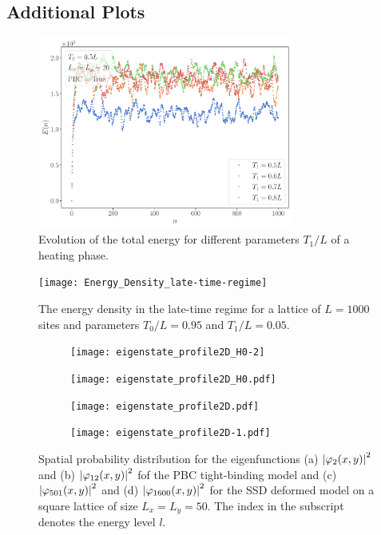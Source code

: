\documentclass[11pt, a4paper, oneside]{book}
\theoremstyle{definition} %
\begin{document}
\begin{appendices}
\chapter{Additional Plots}
\begin{figure}
\centering
\includegraphics[width = 0.75\textwidth]{TotalEnergyHeating2d_Multiple}
\caption{Evolution of the total energy for different parameters $T_1/L$ of a heating phase.}
\label{Total_Energy_heating2d-multiple}
\end{figure}


\begin{figure}
\centering
\texttt{[image: Energy\_Density\_late-time-regime]}
\caption{The energy density in the late-time regime for a lattice of $L=1000$ sites and parameters $T_0/L = 0.95$ and $T_1/L = 0.05$.}
\label{fig:Energy_density-late-regime}
\end{figure}



\begin{figure}
\begin{subfigure}{.5\textwidth}
  \centering
  \texttt{[image: eigenstate\_profile2D\_H0-2]}
  \caption{}
\end{subfigure}
\begin{subfigure}{.5\textwidth}
  \centering
  \texttt{[image: eigenstate\_profile2D\_H0.pdf]}  
  \caption{}
\end{subfigure}

\begin{subfigure}{.5\textwidth}
  \centering
  \texttt{[image: eigenstate\_profile2D.pdf]}
  \caption{}
\end{subfigure}
\begin{subfigure}{.5\textwidth}
  \centering
  \texttt{[image: eigenstate\_profile2D-1.pdf]}  
  \caption{}
\end{subfigure}
\caption{Spatial probability distribution for the eigenfunctions (a) $\abs{\varphi_2(x,y)}^2$ and (b) $\abs{\varphi_{12}(x,y)}^2$ fof the PBC tight-binding model and (c) $\abs{\varphi_{501}(x,y)}^2$ and (d) $\abs{\varphi_{1600}(x,y)}^2$ for the SSD deformed model on a square lattice of size $L_x = L_y = 50$. The index in the subscript denotes the energy level $l$.}
\end{figure}


\end{appendices}
\end{document}
